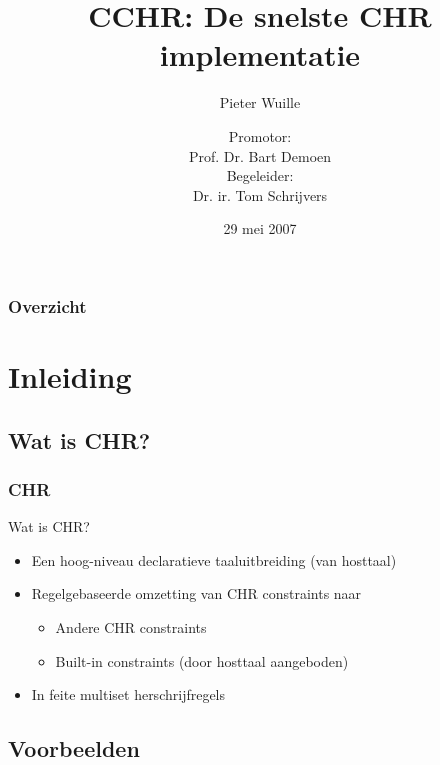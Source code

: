 \documentclass{beamer}
\title{CCHR: De snelste CHR implementatie}
\subtitle{Pieter Wuille}
\author{Promotor: \\
Prof. Dr. Bart Demoen \\
Begeleider: \\
Dr. ir. Tom Schrijvers}
\date{29 mei 2007}
\begin{document}
\frame{\titlepage}


\begin{frame}
  \frametitle{Overzicht}
  \tableofcontents[hideothersubsections]
\end{frame}


\section{Inleiding}

\subsection{Wat is CHR?}

\begin{frame}[containsverbatim]
  \frametitle{CHR}
  \begin{block}{Wat is CHR?}
    \begin{itemize}
      \item Een hoog-niveau declaratieve taaluitbreiding (van hosttaal)
      \item Regelgebaseerde omzetting van CHR constraints naar \begin{itemize}
        \item Andere CHR constraints
        \item Built-in constraints (door hosttaal aangeboden)
      \end{itemize}
      \item In feite multiset herschrijfregels
    \end{itemize}
  \end{block}

\end{frame}

\subsection{Voorbeelden}
\end{document}
